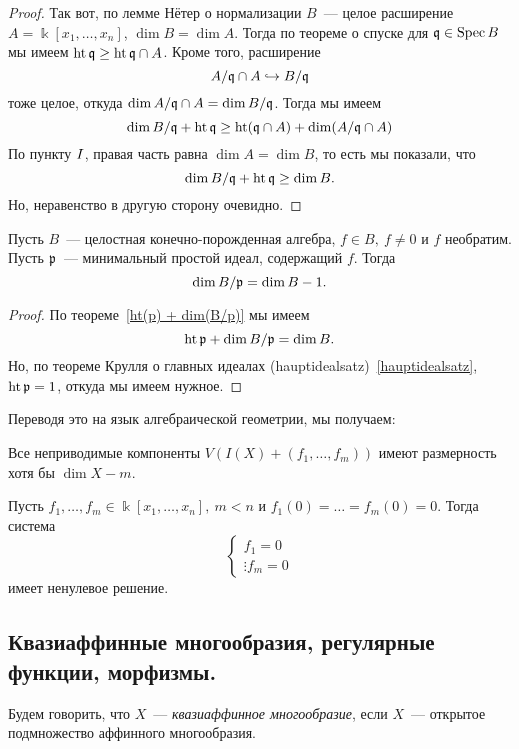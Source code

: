 \begin{proof}
		Так вот, по лемме Нётер о нормализации $B$~--- целое расширение $A = \Bbbk[x_1, \ldots, x_n]$, $\dim{B} = \dim{A}$. Тогда по теореме о спуске для $\mathfrak{q} \in \operatorname{Spec}{B}$ мы имеем $\operatorname{ht}{\mathfrak{q}} \ge \operatorname{ht}{\mathfrak{q} \cap A}$. Кроме того, расширение 
		\[
			A/\mathfrak{q} \cap A \hookrightarrow B/\mathfrak{q}
		\]
		тоже целое, откуда $\dim{A/\mathfrak{q}\cap A} = \dim{B/\mathfrak{q}}$.  Тогда мы имеем 
		\[
			\dim{B/\fq} + \Ht{\fq} \ge \Ht\lr*{\fq \cap A} + \dim\lr*{A/\fq \cap A}
		\]
		По пункту $\RNum{1}$, правая часть равна $\dim{A} = \dim{B}$, то есть мы показали, что 
		\[
			\dim{B/\mathfrak{q}} + \operatorname{ht}{\mathfrak{q}} \ge \dim{B}.
		\]
		Но, неравенство в другую сторону очевидно.

	\end{proof}

	\begin{corollary}
		Пусть $B$~--- целостная конечно-порожденная алгебра, $f \in B, \ f \neq 0$ и $f$ необратим. Пусть $\mathfrak{p}$~--- минимальный простой идеал, содержащий $f$. Тогда 
		\[
			\dim{B/\mathfrak{p}} = \dim{B} - 1.
		\]
	\end{corollary}
	\begin{proof}
		По теореме~\ref{ht(p) + dim(B/p)} мы имеем 
		\[
			\operatorname{ht}{\mathfrak{p}} + \dim{B/\mathfrak{p}} = \dim{B}.
		\]
		Но, по теореме Крулля о главных идеалах (hauptidealsatz)~\ref{hauptidealsatz}, $\operatorname{ht}{\mathfrak{p}} = 1$, откуда мы имеем нужное.  
	\end{proof}

	Переводя это на язык алгебраической геометрии, мы получаем:

	\begin{statement}\label{dim{X} - m} 
		Все неприводимые компоненты $V(I(X) + (f_1, \ldots, f_m))$ имеют размерность хотя бы $\dim{X} - m$.		
	\end{statement}
	
	\begin{corollary}
		Пусть $f_1, \ldots, f_m \in \Bbbk[x_1, \ldots, x_n], \ m < n$ и $f_1(0) = \ldots = f_m(0) = 0$. Тогда система 
		\[
			\begin{cases} 
			f_1 = 0 \\ 
			\vdots 
			f_m = 0
			\end{cases}
		\]
		имеет ненулевое решение. 
	\end{corollary}

	\subsection{Квазиаффинные многообразия, регулярные функции, морфизмы. }


	\begin{definition} 
		Будем говорить, что $X$~--- \emph{квазиаффинное многообразие}, если $X$~--- открытое подмножество аффинного многообразия. 
	\end{definition}

